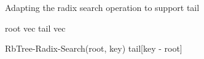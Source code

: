 \begin{listing}[ht!]
    \caption{Adapting the radix search operation to support tail}
    \label{lst:pvec-radix-search}
    
    \begin{algorithmic}
        
        \State root \la vec
        \State tail \la vec

            \State \Return RbTree-Radix-Search(root, key)            
        \Else            
            \State \Return tail[key - root]            
        \EndIf
        \EndFunction
    \end{algorithmic}
\end{listing}